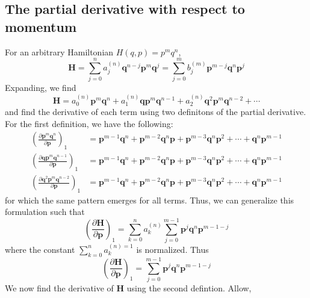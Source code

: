 \documentclass[a4paper]{article}
\theoremstyle{definition}
\begin{document}
		\subsection{The partial derivative with respect to momentum}
		For an arbitrary Hamiltonian $H(q,p)=p^mq^n$,
		\begin{equation}
			\textbf{H}=\sum_{j=0}^{n}a_j^{(n)}\textbf{q}^{n-j}\textbf{p}^m\textbf{q}^j=\sum_{j=0}^mb^{(m)}_j\textbf{p}^{m-j}\textbf{q}^n\textbf{p}^j
		\end{equation}
		Expanding, we find
		\begin{equation}
			\textbf{H}=a_0^{(n)}\textbf{p}^m\textbf{q}^n+a_1^{(n)}\textbf{q}\textbf{p}^m\textbf{q}^{n-1}+a_2^{(n)}\textbf{q}^2\textbf{p}^m\textbf{q}^{n-2}+\cdots
		\end{equation}
		and find the derivative of each term using two definitons of the partial derivative. For the first definition, we have the following:
		\begin{align}
			\left(\frac{\partial\textbf{p}^m\textbf{q}^n}{\partial\textbf{p}}\right)_1&=\textbf{p}^{m-1}\textbf{q}^n+\textbf{p}^{m-2}\textbf{q}^n\textbf{p}+\textbf{p}^{m-3}\textbf{q}^n\textbf{p}^{2}+\cdots+\textbf{q}^n\textbf{p}^{m-1} \\
			\left(\frac{\partial\textbf{q}\textbf{p}^m\textbf{q}^{n-1}}{\partial\textbf{p}}\right)_1&=\textbf{p}^{m-1}\textbf{q}^n+\textbf{p}^{m-2}\textbf{q}^n\textbf{p}+\textbf{p}^{m-3}\textbf{q}^n\textbf{p}^{2}+\cdots+\textbf{q}^n\textbf{p}^{m-1} \\
			\left(\frac{\partial\textbf{q}^2\textbf{p}^m\textbf{q}^{n-2}}{\partial\textbf{p}}\right)_1&=\textbf{p}^{m-1}\textbf{q}^n+\textbf{p}^{m-2}\textbf{q}^n\textbf{p}+\textbf{p}^{m-3}\textbf{q}^n\textbf{p}^{2}+\cdots+\textbf{q}^n\textbf{p}^{m-1}
		\end{align}
		for which the same pattern emerges for all terms. Thus, we can generalize this formulation such that
		\begin{equation}
			\left( \frac{\partial\textbf{H}}{\partial\textbf{p}}\right)_1=\sum_{k=0}^na_k^{(n)}\sum_{j=0}^{m-1}\textbf{p}^j\textbf{q}^n\textbf{p}^{m-1-j}
		\end{equation}
		where the constant $\sum_{k=0}^na_k^{(n)=1}$ is normalized. Thus
		\begin{equation}
						\left( \frac{\partial\textbf{H}}{\partial\textbf{p}}\right)_1=\sum_{j=0}^{m-1}\textbf{p}^j\textbf{q}^n\textbf{p}^{m-1-j}
		\end{equation}
		We now find the derivative of $\textbf{H}$ using the second defintion. Allow,
\end{document}
